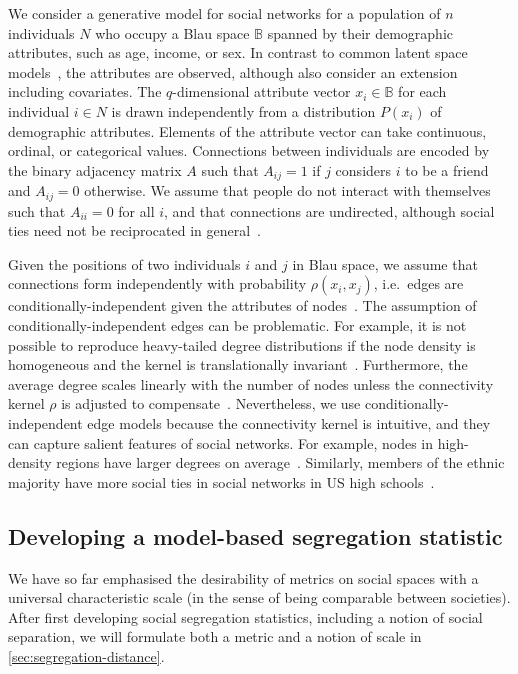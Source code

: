 \documentclass{scrartcl}
\newcommand{\population}{N}
\newcommand{\blauspace}{\mathbb{B}}
\begin{document}
We consider a generative model for social networks for a population of $n$ individuals $\population$ who occupy a Blau space $\blauspace$ spanned by their demographic attributes, such as age, income, or sex. In contrast to common latent space models~\cite{Hoff2002, Hoff2008, Handcock2007}, the attributes are observed, although \textcite{Hoff2002} also consider an extension including covariates. The $q$-dimensional attribute vector $x_i\in\blauspace$ for each individual $i\in \population$ is drawn independently from a distribution $P(x_i)$ of demographic attributes. Elements of the attribute vector can take continuous, ordinal, or categorical values. Connections between individuals are encoded by the binary adjacency matrix $A$ such that $A_{ij}=1$ if $j$ considers $i$ to be a friend and $A_{ij}=0$ otherwise. We assume that people do not interact with themselves such that $A_{ii}=0$ for all $i$, and that connections are undirected, although social ties need not be reciprocated in general~\cite{Ball2013}.

Given the positions of two individuals $i$ and $j$ in Blau space, we assume that connections form independently with probability $\rho(x_i, x_j)$, i.e.\ edges are conditionally-independent given the attributes of nodes~\cite{Fienberg2012}. The assumption of conditionally-in\-de\-pen\-dent edges can be problematic. For example, it is not possible to reproduce heavy-tailed degree distributions if the node density is homogeneous and the kernel is translationally invariant~\cite{Barnett2007}. Furthermore, the average degree scales linearly with the number of nodes unless the connectivity kernel $\rho$ is adjusted to compensate~\cite{Caron2017}. Nevertheless, we use conditionally-independent edge models because the connectivity kernel is intuitive, and they can capture salient features of social networks. For example, nodes in high-density regions have larger degrees on average~\cite{Barnett2007}. Similarly, members of the ethnic majority have more social ties in social networks in US high schools~\cite{Currarini2009}.

\subsection{Developing a model-based segregation statistic\label{sec:model-based-segregation}}

We have so far emphasised the desirability of metrics on social spaces with a universal characteristic scale (in the sense of being comparable between societies). After first developing social segregation statistics, including a notion of social separation, we will formulate both a metric and a notion of scale in \cref{sec:segregation-distance}.
\end{document}

